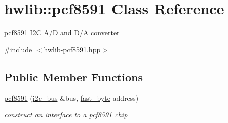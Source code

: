 \hypertarget{classhwlib_1_1pcf8591}{}\section{hwlib\+:\+:pcf8591 Class Reference}
\label{classhwlib_1_1pcf8591}


\hyperlink{classhwlib_1_1pcf8591}{pcf8591} I2C A/D and D/A converter  




{\ttfamily \#include $<$hwlib-\/pcf8591.\+hpp$>$}

\subsection*{Public Member Functions}
\begin{DoxyCompactItemize}
\item 
\hyperlink{classhwlib_1_1pcf8591_a0675613426b471f4dfcd74e83a4421b6}{pcf8591} (\hyperlink{classhwlib_1_1i2c__bus}{i2c\+\_\+bus} \&bus, \hyperlink{hwlib-defines_8hpp_a54998f25522db04b7b797b0fcc9eb3d5}{fast\+\_\+byte} address)
\begin{DoxyCompactList}\small\item\em construct an interface to a \hyperlink{classhwlib_1_1pcf8591}{pcf8591} chip \end{DoxyCompactList}\end{DoxyCompactItemize}
